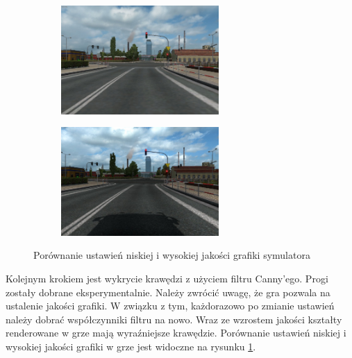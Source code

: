\begin{figure}[h]
	\centering
	\begin{subfigure}{0.35\textwidth}
		\centering
		\includegraphics[width=6cm]{img/low_details.jpg}
		\subcaption{\label{fig:low_details}}
	\end{subfigure}
	\begin{subfigure}{0.35\textwidth}
		\centering
		\includegraphics[width=6cm]{img/high_details.jpg}
		\subcaption{\label{fig:high_details}}
	\end{subfigure}
	
	\caption{\label{fig:details1}Porównanie ustawień niskiej \protect{} i wysokiej \protect{} jakości grafiki symulatora}
\end{figure}

Kolejnym krokiem jest wykrycie krawędzi z użyciem filtru Canny'ego. 
Progi zostały dobrane eksperymentalnie. %
Należy zwrócić uwagę, że gra pozwala na ustalenie jakości grafiki. 
W związku z tym, każdorazowo po zmianie ustawień należy dobrać współczynniki filtru na nowo. 
Wraz ze wzrostem jakości kształty renderowane w grze mają wyraźniejsze krawędzie. %
Porównanie ustawień niskiej i wysokiej jakości grafiki w grze jest widoczne na rysunku \ref{fig:details1}. %




